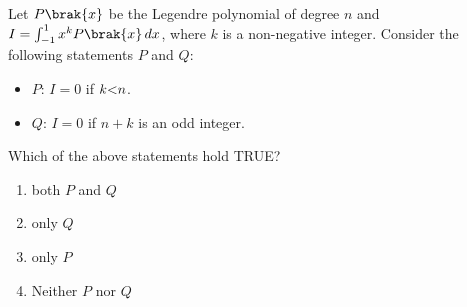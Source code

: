     \item Let $P\brak{x}$ be the Legendre polynomial of degree $n$ and $I = \int_{-1}^{1} x^k P\brak{x} \, dx$, where $k$ is a non-negative integer. Consider the following statements $P$ and $Q$:
    \begin{itemize}
        \item $P$: $I = 0$ if $k \text{\textless} n$.
        \item $Q$: $I = 0$ if $n + k$ is an odd integer.
    \end{itemize}
    Which of the above statements hold TRUE?
    \begin{enumerate}
       
        \item both $P$ and $Q$
        \item only $Q$
        \item only $P$
        \item Neither $P$ nor $Q$
    \end{enumerate}


